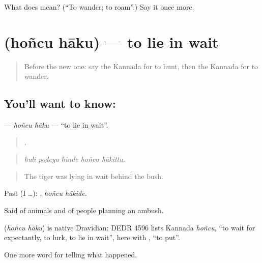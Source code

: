 \begin{tcolorbox}[breakable,colback=teal!4,colframe=teal!35!black,title={Before you move on}]
What does  mean? (\textquotedblleft{}To wander; to roam\textquotedblright{}.) Say it once more.
\end{tcolorbox}
\section[\texorpdfstring{\kn{ಹೊಂಚು} \kn{ಹಾಕು} (hoñcu hāku)}{ಹೊಂಚು ಹಾಕು (hoñcu hāku)}]{  (hoñcu hāku) — to lie in wait}

\label{lesson:KA-C360-honcu-haku}



\begin{quote}
Before the new one: say the Kannada for to hunt, then the Kannada for to wander.
\end{quote}

\subsection*{You'll want to know:  }
\textbf{ } — \emph{hoñcu hāku} — \textquotedblleft{}to lie in wait\textquotedblright{}.

\begin{quote}
    .
\end{quote}

\begin{quote}
\emph{huli podeya hinde hoñcu hākittu.}
\end{quote}

\begin{quote}
The tiger was lying in wait behind the bush.
\end{quote}

Past (I …):  , \emph{hoñcu hākide}.

Said of animals and of people planning an ambush.

\begin{cousinweb}
\textbf{ } (\emph{hoñcu hāku}) is native Dravidian: DEDR 4596 lists Kannada \emph{hoñcu}, \textquotedblleft{}to wait for expectantly, to lurk, to lie in wait\textquotedblright{}, here with , \textquotedblleft{}to put\textquotedblright{}.
\end{cousinweb}

\begin{grammarlens}[title={What you've built}]
One more word for telling what happened.
\end{grammarlens}

